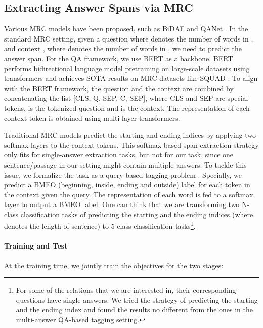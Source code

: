 \documentclass[11pt,a4paper]{article}
\begin{document}
\subsection{Extracting Answer Spans via MRC}
Various MRC models have been proposed, such as BiDAF \cite{seo2016bidirectional} and QANet \cite{yu2018qanet}. 
In the standard MRC setting, given a question  where  denotes the number of words in , and 
context , where  denotes the number of words in , we need to predict the answer span. 
For the QA framework, we use BERT \cite{devlin2018bert} as a backbone.
BERT performs 
bidirectional language model pretraining on large-scale datasets using transformers \cite{vaswani2017attention} and achieves SOTA results on MRC datasets like SQUAD \cite{rajpurkar2016squad}. 
 To align with the BERT framework,  the question  and the context  are combined  
 by concatenating the list [CLS, Q, SEP, C, SEP], where CLS and SEP are special tokens,  is the tokenized question and  is the context. 
The representation of each context token is obtained using multi-layer transformers.

 
 
Traditional MRC models \cite{wang2016machine,xiong2017dcn} predict the starting and ending indices 
by applying
two softmax layers to the context tokens.
This
softmax-based span extraction strategy only fits for single-answer extraction tasks, but not for our task,  
since one sentence/passage in our setting might contain multiple answers. 
To tackle this issue, 
we formalize the  task as a query-based tagging problem \cite{lafferty2001conditional,huang2015bidirectional,ma2016end}. Specially, 
we predict a BMEO (beginning, inside, ending and outside) label for each token in the context given the query. 
The representation of each word is fed to a softmax layer to output a BMEO label. 
One can think that we are transforming two N-class classification tasks of predicting the starting and the ending indices 
(where  denotes the length of sentence) to  5-class classification tasks\footnote{
For some of the relations that we are interested in, their corresponding questions have single answers.  We tried the strategy of predicting the starting and the ending index and found the results no different from the ones in the multi-answer QA-based tagging setting.  }.


\paragraph{Training and Test}
At the training time, we jointly train the objectives for the two stages:
\end{document}
